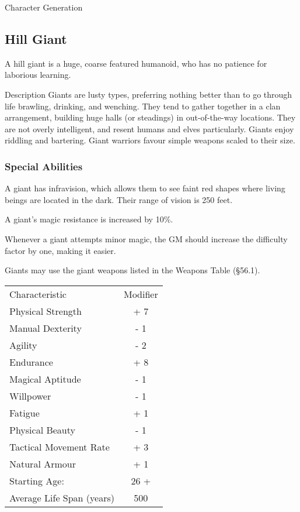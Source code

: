 \begin{Chapter}{Character Generation}
\subsection{Hill Giant}

A hill giant is a huge, coarse featured humanoid, who has no patience
for laborious learning.

\begin{Description}
\item[Description] Giants are lusty types, preferring nothing better
  than to go through life brawling, drinking, and wenching.  They tend
  to gather together in a clan arrangement, building huge halls (or
  steadings) in out-of-the-way locations. They are not overly
  intelligent, and resent humans and elves particularly.  Giants enjoy
  riddling and bartering.  Giant warriors favour simple weapons scaled
  to their size.
\end{Description}

\subsubsection{Special Abilities}

\begin{Enumerate}
\item A giant has infravision, which allows them to see faint red
  shapes where living beings are located in the dark. Their range of
  vision is 250 feet.

\item A giant’s magic resistance is increased by 10\%. 

\item Whenever a giant attempts minor magic, the GM should increase
  the difficulty factor by one, making it easier.

\item Giants may use the giant weapons listed in the Weapons Table
  (§56.1).

\end{Enumerate}

\begin{tabularx}{\columnwidth}{Xc}
Characteristic			& Modifier \\
Physical Strength		& + 7 \\
Manual Dexterity		& - 1 \\
Agility				& - 2 \\
Endurance			& + 8 \\
Magical Aptitude		& - 1 \\
Willpower			& - 1 \\
Fatigue				& + 1 \\
Physical Beauty			& - 1 \\
Tactical Movement Rate		& + 3 \\
Natural Armour			& + 1 \\
Starting Age:			& 26 + \\
Average Life Span (years)	& 500 \\
\end{tabularx}


\end{Chapter}
